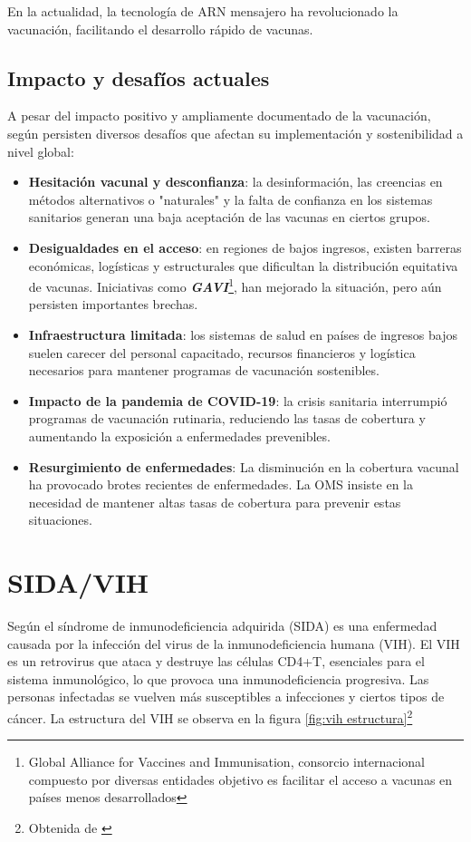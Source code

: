 \begin{enumerate}
En la actualidad, la tecnología de ARN mensajero ha revolucionado la vacunación, facilitando el desarrollo rápido de vacunas.





\subsection{Impacto y desafíos actuales}
A pesar del impacto positivo y ampliamente documentado de la vacunación, según \cite{lindstrand2021world}persisten diversos desafíos que afectan su implementación y sostenibilidad a nivel global:
\begin{itemize}
    \item \textbf{Hesitación vacunal y desconfianza}: la desinformación, las creencias en métodos alternativos o "naturales" y la falta de confianza en los sistemas sanitarios generan una baja aceptación de las vacunas en ciertos grupos. 
    \item \textbf{Desigualdades en el acceso}: en regiones de bajos ingresos, existen barreras económicas, logísticas y estructurales que dificultan la distribución equitativa de vacunas. Iniciativas como \textbf{\textit{GAVI}}\footnote{Global Alliance for Vaccines and Immunisation, consorcio internacional compuesto por diversas entidades objetivo es facilitar el acceso a vacunas en países menos desarrollados}, han mejorado la situación, pero aún persisten importantes brechas.
    \item \textbf{Infraestructura limitada}: los sistemas de salud en países de ingresos bajos suelen carecer del personal capacitado, recursos financieros y logística necesarios para mantener programas de vacunación sostenibles.
    \item \textbf{Impacto de la pandemia de COVID-19}: la crisis sanitaria interrumpió programas de vacunación rutinaria, reduciendo las tasas de cobertura y aumentando la exposición a enfermedades prevenibles.
    \item \textbf{Resurgimiento de enfermedades}: La disminución en la cobertura vacunal ha provocado brotes recientes de enfermedades. La OMS insiste en la necesidad de mantener altas tasas de cobertura para prevenir estas situaciones.
\end{itemize}



\section{SIDA/VIH}
Según \cite{sudharshan2008introduction} el síndrome de inmunodeficiencia adquirida (SIDA)  es una enfermedad causada por la infección del virus de la inmunodeficiencia humana (VIH). El VIH es un retrovirus que ataca y destruye las células CD4+T, esenciales para el sistema inmunológico, lo que provoca una inmunodeficiencia progresiva. Las personas infectadas se vuelven más susceptibles a infecciones y ciertos tipos de cáncer. La estructura del VIH se observa en la figura \ref{fig:vih estructura}\footnote{Obtenida de \cite{infosida_vih}}


\end{enumerate}
